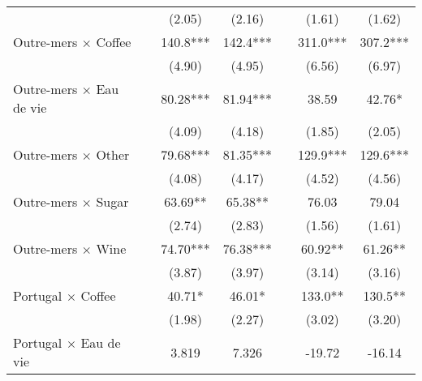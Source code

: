 {\begin{tabular}{l*{6}{c}}
                    &                     &      (2.05)         &      (2.16)         &                     &      (1.61)         &      (1.62)         \\
[1em]
Outre-mers $\times$ Coffee&                     &       140.8***&       142.4***&                     &       311.0***&       307.2***\\
                    &                     &      (4.90)         &      (4.95)         &                     &      (6.56)         &      (6.97)         \\
[1em]
Outre-mers $\times$ Eau de vie&                     &       80.28***&       81.94***&                     &       38.59         &       42.76*  \\
                    &                     &      (4.09)         &      (4.18)         &                     &      (1.85)         &      (2.05)         \\
[1em]
Outre-mers $\times$ Other&                     &       79.68***&       81.35***&                     &       129.9***&       129.6***\\
                    &                     &      (4.08)         &      (4.17)         &                     &      (4.52)         &      (4.56)         \\
[1em]
Outre-mers $\times$ Sugar&                     &       63.69** &       65.38** &                     &       76.03         &       79.04         \\
                    &                     &      (2.74)         &      (2.83)         &                     &      (1.56)         &      (1.61)         \\
[1em]
Outre-mers $\times$ Wine&                     &       74.70***&       76.38***&                     &       60.92** &       61.26** \\
                    &                     &      (3.87)         &      (3.97)         &                     &      (3.14)         &      (3.16)         \\
[1em]
Portugal $\times$ Coffee&                     &       40.71*  &       46.01*  &                     &       133.0** &       130.5** \\
                    &                     &      (1.98)         &      (2.27)         &                     &      (3.02)         &      (3.20)         \\
[1em]
Portugal $\times$ Eau de vie&                     &       3.819         &       7.326         &                     &      -19.72         &      -16.14         \\

\end{tabular}}
